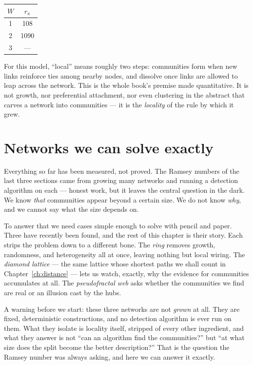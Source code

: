 \begin{center}
\begin{tabular}{cc}
\hline
$W$ & $r_\kappa$ \\
\hline
1 & 108 \\
2 & 1090 \\
3 & --- \\
\hline
\end{tabular}
\end{center}

For this model, ``local'' means roughly two steps: communities form
when new links reinforce ties among nearby nodes, and dissolve once links are
allowed to leap across the network. This is the whole book's premise made
quantitative. It is not growth, nor preferential attachment, nor even clustering
in the abstract that carves a network into communities --- it is the
\emph{locality} of the rule by which it grew.

\section{Networks we can solve exactly}

Everything so far has been measured, not proved. The Ramsey numbers of the last
three sections came from growing many networks and running a detection algorithm
on each --- honest work, but it leaves the central question in the dark. We know
\emph{that} communities appear beyond a certain size. We do not know \emph{why},
and we cannot say what the size depends on.

To answer that we need cases simple enough to solve with pencil and paper. Three
have recently been found, and the rest of this chapter is their story. Each strips
the problem down to a different bone. The \emph{ring} \citep{vazquezring2026}
removes growth, randomness, and heterogeneity all at once, leaving nothing but
local wiring. The \emph{diamond lattice} \citep{vazquezrg2026} --- the same
lattice whose shortest paths we shall count in Chapter~\ref{ch:distance} --- lets
us watch, exactly, why the evidence for communities accumulates at all. The
\emph{pseudofractal web} \citep{vazquezpseudofractal2026} asks whether the
communities we find are real or an illusion cast by the hubs.

A warning before we start: these three networks are not \emph{grown} at all. They
are fixed, deterministic constructions, and no detection algorithm is ever run on
them. What they isolate is locality itself, stripped of every other ingredient,
and what they answer is not ``can an algorithm find the communities?'' but ``at
what size does the split become the better description?'' That is the question the
Ramsey number was always asking, and here we can answer it exactly.

